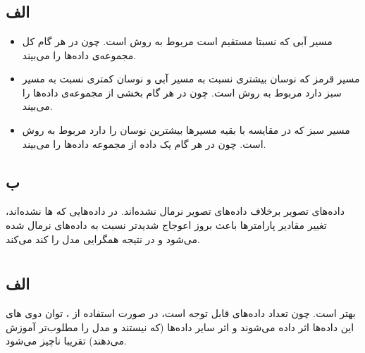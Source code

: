 \documentclass{article}
\begin{document}


\newpage


\section{}
\subsection{الف}
\begin{itemize}
  \item مسیر آبی که نسبتا مستقیم است مربوط به روش  است. چون در هر گام کل مجموعه‌ی داده‌ها را می‌بیند.
  \item مسیر قرمز که نوسان بیشتری نسبت به مسیر آبی و نوسان کمتری نسبت به مسیر سبز دارد مربوط به روش  است. چون در هر گام بخشی از مجموعه‌ی داده‌ها را می‌بیند.
  \item مسیر سبز که در مقایسه با بقیه مسیرها بیشترین نوسان را دارد مربوط به روش  است. چون در هر گام یک داده از مجموعه داده‌ها را می‌بیند.
\end{itemize}


\subsection{ب}
داده‌های تصویر  برخلاف داده‌های تصویر  نرمال نشده‌اند. در داده‌هایی که ها  نشده‌اند، تغییر مقادیر پارامترها باعث بروز اعوجاج شدیدتر نسبت به داده‌های نرمال شده می‌شود و در نتیجه همگرایی مدل را کند می‌کند.


\section{}
\subsection{الف}
 بهتر است. چون تعداد داده‌های  قابل توجه است، در صورت استفاده از ، توان دوی های این داده‌ها اثر داده می‌شوند و اثر سایر داده‌ها (که  نیستند و مدل را مطلوب‌تر آموزش می‌دهند) تقریبا ناچیز می‌شود.
\end{document}
